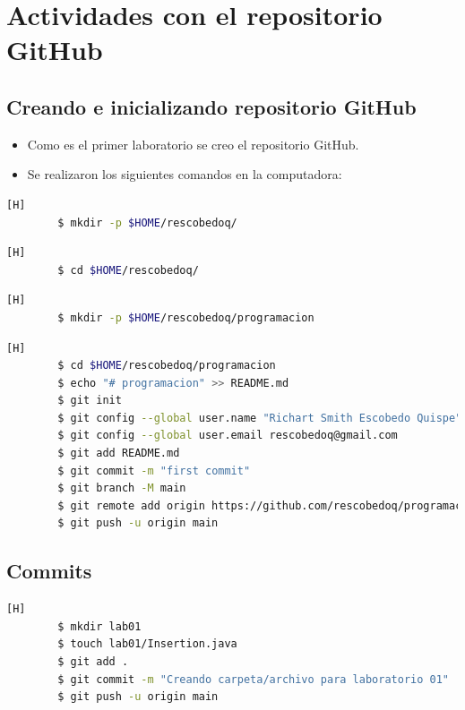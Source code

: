 \documentclass{article}
\begin{document}
	\section{Actividades con el repositorio GitHub}
	
	\subsection{Creando e inicializando repositorio GitHub}
	\begin{itemize}	
		\item Como es el primer laboratorio se creo el repositorio GitHub.
		\item Se realizaron los siguientes comandos en la computadora:
	\end{itemize}	
		
	\begin{lstlisting}[language=bash,caption={Creando directorio de trabajo}][H]
		$ mkdir -p $HOME/rescobedoq/
	\end{lstlisting}
	\begin{lstlisting}[language=bash,caption={Dirijíéndonos al directorio de trabajo}][H]
		$ cd $HOME/rescobedoq/
	\end{lstlisting}	
	\begin{lstlisting}[language=bash,caption={Creando directorio para repositorio GitHub}][H]
		$ mkdir -p $HOME/rescobedoq/programacion
	\end{lstlisting}
	\begin{lstlisting}[language=bash,caption={Inicializando directorio para repositorio GitHub}][H]
		$ cd $HOME/rescobedoq/programacion
		$ echo "# programacion" >> README.md
		$ git init
		$ git config --global user.name "Richart Smith Escobedo Quispe"
		$ git config --global user.email rescobedoq@gmail.com
		$ git add README.md
		$ git commit -m "first commit"
		$ git branch -M main
		$ git remote add origin https://github.com/rescobedoq/programacion.git
		$ git push -u origin main
	\end{lstlisting}
	
	\subsection{Commits}
	\begin{lstlisting}[language=bash,caption={Primer Commit Creando carpeta/archivo para laboratorio 01}][H]
		$ mkdir lab01
		$ touch lab01/Insertion.java
		$ git add .
		$ git commit -m "Creando carpeta/archivo para laboratorio 01"			
		$ git push -u origin main
	\end{lstlisting}
	
\end{document}
